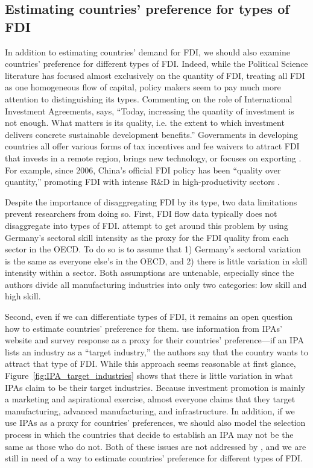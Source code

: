 \subsection{Estimating countries' preference for types of FDI}

In addition to estimating countries' demand for FDI, we should also examine
countries' preference for different types of FDI. Indeed, while the Political
Science literature has focused almost exclusively on the quantity of FDI,
treating all FDI as one homogeneous flow of capital, policy makers seem to pay
much more attention to distinguishing its types. Commenting on the role of
International Investment Agreements, \citet{UNCTAD2015} says, ``Today,
increasing the quantity of investment is not enough. What matters is its
quality, i.e. the extent to which investment delivers concrete sustainable
development benefits.'' Governments in developing countries all offer various
forms of tax incentives and fee waivers to attract FDI that invests in a remote
region, brings new technology, or focuses on exporting \citep{Ricupero2000}. For
example, since 2006, China's official FDI policy has been ``quality over
quantity,'' promoting FDI with intense R\&D in high-productivity sectors
\citep{Guangzhou2011}.

Despite the importance of disaggregating FDI by its type, two data limitations
prevent researchers from doing so. First, FDI flow data typically does not
disaggregate into types of FDI. \citet{Alfaro2007} attempt to get around this
problem by using Germany's sectoral skill intensity as the proxy for the FDI
quality from each sector in the OECD. To do so is to assume that 1) Germany's
sectoral variation is the same as everyone else's in the OECD, and 2) there is
little variation in skill intensity within a sector. Both assumptions are
untenable, especially since the authors divide all manufacturing industries into
only two categories: low skill and high skill.

Second, even if we can differentiate types of FDI, it remains an open question
how to estimate countries' preference for them. \citet{Alfaro2007} use
information from IPAs' website and survey response as a proxy for their
countries' preference---if an IPA lists an industry as a ``target industry,''
the authors say that the country wants to attract that type of FDI. While this
approach seems reasonable at first glance,
Figure~\ref{fig:IPA_target_industries} shows that there is little variation in
what IPAs claim to be their target industries. Because investment promotion is
mainly a marketing and aspirational exercise, almost everyone claims that they
target manufacturing, advanced manufacturing, and infrastructure. In addition,
if we use IPAs as a proxy for countries' preferences, we should also model the
selection process in which the countries that decide to establish an IPA may not
be the same as those who do not. Both of these issues are not addressed by
\citet{Alfaro2007}, and we are still in need of a way to estimate countries'
preference for different types of FDI.

